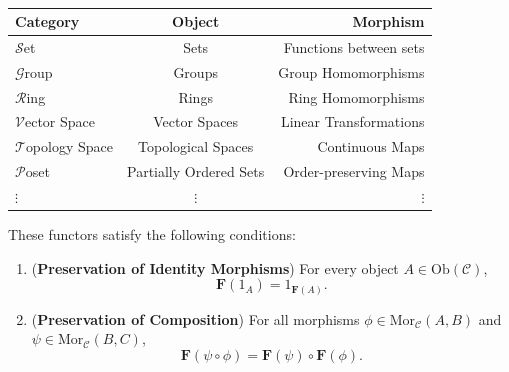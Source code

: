 \documentclass[11pt,openany]{article}
\begin{document}
\newpage
\begin{example}
\ \begin{table}[h!]\centering{}
\begin{tabular*}{\textwidth}{@{\extracolsep{\fill}}lcr}\hline
	\textbf{Category} & \textbf{Object} & \textbf{Morphism} \\ \hline\hline
	$\mathscr{S}$et & Sets & Functions between sets \\ \hline
	$\mathscr{G}$roup & Groups & Group Homomorphisms \\ \hline
	$\mathscr{R}$ing & Rings & Ring Homomorphisms \\ \hline
	$\mathscr{V}$ector Space & Vector Spaces & Linear Transformations \\ \hline
	$\mathscr{T}$opology Space & Topological Spaces & Continuous Maps \\ \hline
	$\mathscr{P}$oset & Partially Ordered Sets & Order-preserving Maps \\ \hline
	$\vdots$ & $\vdots$ & $\vdots$ \\ \hline
\end{tabular*}
\end{table}
\end{example}
\vfill
{}
\begin{remark}
	These functors satisfy the following conditions:
	\begin{enumerate}[1.]
		\item (\textbf{Preservation of Identity Morphisms}) For every object $A\in\text{Ob}(\mathcal{C})$, \[
		\textbf{F}(1_A)=1_{\textbf{F}(A)}.
		\]
		\item (\textbf{Preservation of Composition}) For all morphisms
		$\phi\in\text{Mor}_{\mathcal{C}}(A,B)$ and $\psi\in\text{Mor}_{\mathcal{C}}(B,C)$, \[
		\textbf{F}(\psi\circ\phi) = \textbf{F}(\psi)\circ \textbf{F}(\phi).
		\]
	\end{enumerate}
\end{remark}
\end{document}
